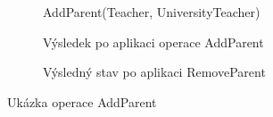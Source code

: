 \documentclass[11pt,twoside,a4paper]{book}
\begin{document}
\begin{figure}
\centering
\begin{subfigure}[b]{0.33\textwidth}
\caption{AddParent(Teacher, UniversityTeacher)}
\label{fig:add_parent}
\end{subfigure}
%
\begin{subfigure}[b]{0.33\textwidth}
\caption{Výsledek po aplikaci operace AddParent}
\label{fig:remove_parent}
\end{subfigure}
%
\begin{subfigure}[b]{0.33\textwidth}
\caption{Výsledný stav po aplikaci RemoveParent}
\label{fig:remove_parent_apl}
\end{subfigure}
%
\caption{Ukázka operace AddParent}
\end{figure}
\end{document}
